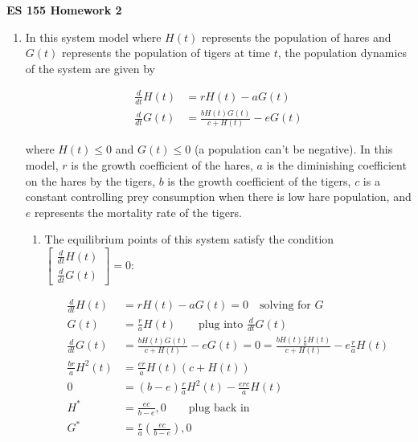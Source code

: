 \documentclass[11pt]{article}
\theoremstyle{definition}
\begin{document}
\textbf{\huge{ES 155 Homework 2}}    %
\normalsize

\begin{enumerate}
    \item %
    In this system model where $H(t)$ represents the population of hares and $G(t)$ represents the population of tigers at time $t$, the population dynamics of the system are given by

    \begin{align}
        \frac{d}{dt} H(t) &= r H(t) - a G(t) \\
        \frac{d}{dt} G(t) &= \frac{b H(t) G(t)}{c + H(t)} - e G(t)
    \end{align}

    where $H(t) \leq 0$ and $G(t) \leq 0$ (a population can't be negative).  In this model, $r$ is the growth coefficient of the hares, $a$ is the diminishing coefficient on the hares by the tigers, $b$ is the growth coefficient of the tigers, $c$ is a constant controlling prey consumption when there is low hare population, and $e$ represents the mortality rate of the tigers.

    \begin{enumerate}
        \item %
        The equilibrium points of this system satisfy the condition $\begin{bmatrix} \frac{d}{dt} H(t) \\ \frac{d}{dt} G(t) \end{bmatrix} = 0$:

        \begin{align}
            \frac{d}{dt} H(t) &= r H(t) - a G(t) = 0 \quad \text{solving for $G$} \\
            G(t) &= \frac{r}{a} H(t) \quad \quad \text{plug into $\frac{d}{dt}G(t)$}\\
            \frac{d}{dt} G(t) &= \frac{b H(t) G(t)}{c + H(t)} - e G(t) = 0 = \frac{b H(t) \frac{r}{a} H(t) }{c + H(t)} - e \frac{r}{a} H(t) \\
            \frac{br}{a} H^2(t) &= \frac{er}{a} H(t) \left( c + H(t) \right) \\
            0 &= (b - e) \frac{r}{a} H^2(t) - \frac{erc}{a}H(t) \\
            H^* &= \frac{ec}{b - e}, 0 \quad \quad \text{plug back in} \\
            G^* &= \frac{r}{a} \left( \frac{ec}{b-e} \right), 0
        \end{align}


\end{enumerate}
\end{enumerate}
\end{document}
